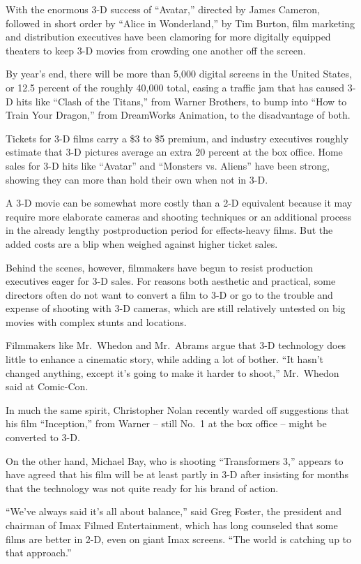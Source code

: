 ﻿\documentclass[12pt]{article}
\begin{document}
With the enormous 3-D success of ``Avatar,'' directed by James Cameron, followed in short order by
``Alice in Wonderland,'' by Tim Burton, film marketing and distribution executives have been
clamoring for more digitally equipped theaters to keep 3-D movies from crowding one another off the
screen.

By year's end, there will be more than 5,000 digital screens in the United States, or 12.5 percent
of the roughly 40,000 total, easing a traffic jam that has caused 3-D hits like ``Clash of the
Titans,'' from Warner Brothers, to bump into ``How to Train Your Dragon,'' from DreamWorks
Animation, to the disadvantage of both.

Tickets for 3-D films carry a \$3 to \$5 premium, and industry executives roughly estimate that 3-D
pictures average an extra 20 percent at the box office. Home sales for 3-D hits like ``Avatar'' and
``Monsters vs. Aliens'' have been strong, showing they can more than hold their own when not in 3-D.

A 3-D movie can be somewhat more costly than a 2-D equivalent because it may require more elaborate
cameras and shooting techniques or an additional process in the already lengthy postproduction
period for effects-heavy films. But the added costs are a blip when weighed against higher ticket
sales.

Behind the scenes, however, filmmakers have begun to resist production executives eager for 3-D
sales. For reasons both aesthetic and practical, some directors often do not want to convert a film
to 3-D or go to the trouble and expense of shooting with 3-D cameras, which are still relatively
untested on big movies with complex stunts and locations.

Filmmakers like Mr.~Whedon and Mr.~Abrams argue that 3-D technology does little to enhance a
cinematic story, while adding a lot of bother. ``It hasn't changed anything, except it's going to
make it harder to shoot,'' Mr.~Whedon said at Comic-Con.

In much the same spirit, Christopher Nolan recently warded off suggestions that his film
``Inception,'' from Warner -- still No.~1 at the box office -- might be converted to 3-D.

On the other hand, Michael Bay, who is shooting ``Transformers 3,'' appears to have agreed that his
film will be at least partly in 3-D after insisting for months that the technology was not quite
ready for his brand of action.

``We've always said it's all about balance,'' said Greg Foster, the president and chairman of Imax
Filmed Entertainment, which has long counseled that some films are better in 2-D, even on giant Imax
screens. ``The world is catching up to that approach.''
\end{document}
